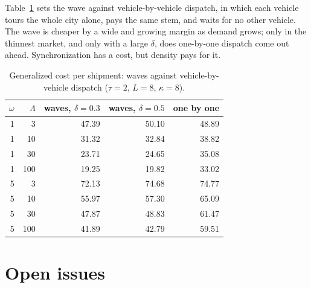 \documentclass[10pt, reqno]{amsart}
\theoremstyle{definition}
\begin{document}
Table~\ref{tab:sync} sets the wave against vehicle-by-vehicle dispatch, in which each vehicle tours the whole city alone, pays the same stem, and waits for no other vehicle. The wave is cheaper by a wide and growing margin as demand grows; only in the thinnest market, and only with a large $\delta$, does one-by-one dispatch come out ahead. Synchronization has a cost, but density pays for it.

\begin{table}[h]
\centering
\caption{Generalized cost per shipment: waves against vehicle-by-vehicle dispatch ($\tau=2$, $L=8$, $\kappa=8$).}\label{tab:sync}
\begin{tabular}{rrrrr}
\toprule
$\omega$ & $\Lambda$ & waves, $\delta=0.3$ & waves, $\delta=0.5$ & one by one\\
\midrule
1 & 3 & 47.39 & 50.10 & 48.89\\
1 & 10 & 31.32 & 32.84 & 38.82\\
1 & 30 & 23.71 & 24.65 & 35.08\\
1 & 100 & 19.25 & 19.82 & 33.02\\
\midrule
5 & 3 & 72.13 & 74.68 & 74.77\\
5 & 10 & 55.97 & 57.30 & 65.09\\
5 & 30 & 47.87 & 48.83 & 61.47\\
5 & 100 & 41.89 & 42.79 & 59.51\\
\bottomrule
\end{tabular}
\end{table}

\section{Open issues}
\end{document}
